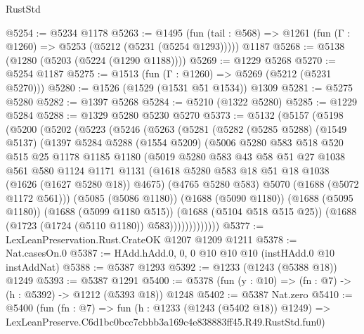 \begin{lexlean}{RustStd}
\begin{coremodule}
@5254 := @5234 @1178
@5263 := @1495
    (fun (tail : @568) => @1261 (fun (Γ : @1260) => @5253 (@5212 (@5231 (@5254 @1293)))))
    @1187
@5268 := @5138 (@1280 (@5203 (@5224 (@1290 @1188))))
@5269 := @1229 @5268
@5270 := @5254 @1187
@5275 := @1513 (fun (Γ : @1260) => @5269 (@5212 (@5231 @5270)))
@5280 := @1526 (@1529 (@1531 @51 @1534)) @1309
@5281 := @5275 @5280
@5282 := @1397 @5268
@5284 := @5210 (@1322 @5280)
@5285 := @1229 @5284
@5288 := @1329 @5280 @5230 @5270
@5373 := @5132
    (@5157
      (@5198
        (@5200
          (@5202
            (@5223
              (@5246
                (@5263
                  (@5281
                    (@5282
                      (@5285 @5288)
                      (@1549 @5137)
                      (@1397
                        @5284
                        @5288
                        (@1554 @5209)
                        (@5006
                          @5280
                          @583
                          @518
                          @520
                          @515
                          @25
                          @1178
                          @1185
                          @1180
                          (@5019
                            @5280
                            @583
                            @43
                            @58
                            @51
                            @27
                            @1038
                            @561
                            @580
                            @1124
                            @1171
                            @1131
                            (@1618 @5280 @583 @18 @51 @18 @1038 (@1626 (@1627 @5280 @18)) @4675)
                            (@4765 @5280 @583)
                            @5070
                            (@1688 (@5072 @1172 @561)))
                          (@5085 (@5086 @1180))
                          (@1688 (@5090 @1180))
                          (@1688 (@5095 @1180))
                          (@1688 (@5099 @1180 @515))
                          (@1688 (@5104 @518 @515 @25))
                          (@1688 (@1723 (@1724 (@5110 @1180)) @583)))))))))))))
@5377 := LexLeanPreservation.Rust.CrateOK @1207 @1209 @1211
@5378 := Nat.casesOn.{0}
@5387 := HAdd.hAdd.{0, 0, 0} @10 @10 @10 (instHAdd.{0} @10 instAddNat)
@5388 := @5387 @1293
@5392 := @1233 (@1243 (@5388 @18)) @1249
@5393 := @5387 @1291
@5400 := @5378 (fun (y : @10) => (fn : @7) -> (h : @5392) -> @1212 (@5393 @18)) @1248
@5402 := @5387 Nat.zero
@5410 := @5400
    (fun (fn : @7) =>
    fun (h : @1233 (@1243 (@5402 @18)) @1249) =>
    LexLeanPreserve.C6d1bc0bcc7cbbb3a169c4e838883ff45.R49.RustStd.fun0)

\end{coremodule}
\end{lexlean}
